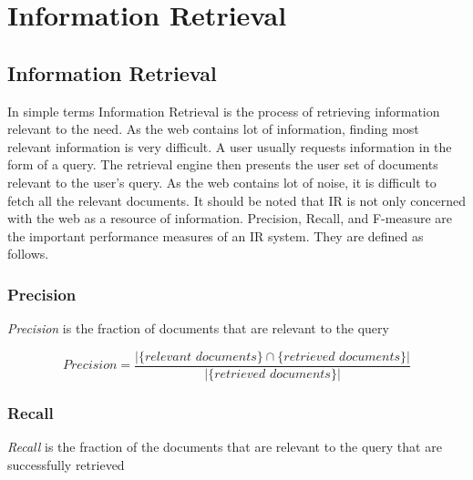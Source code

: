 
\chapter{Information Retrieval} %

\label{Chapter3} %



\section{Information Retrieval}

\par 
In simple terms Information Retrieval is the process of retrieving information relevant to the need. As the web contains lot of
information, finding most relevant information is very difficult. A user usually requests information in the form of a query.
The retrieval engine then presents the user set of documents relevant to the user's query. As the web contains lot of noise, it
is difficult to fetch all the relevant documents. It should be noted that IR is not only concerned with the web as a resource of
information. Precision, Recall, and F-measure are the important performance measures of an IR system. They are defined as follows.

\subsection*{Precision}

\textit{Precision} is the fraction of documents that are relevant to the query

\begin{equation}
 Precision = \frac{|\{\textit{relevant documents}\} \cap \{\textit{retrieved documents}\}|}{|\{\textit{retrieved documents}\}|}
\end{equation}

\subsection*{Recall}

\textit{Recall} is the fraction of the documents that are relevant to the query that are successfully retrieved

